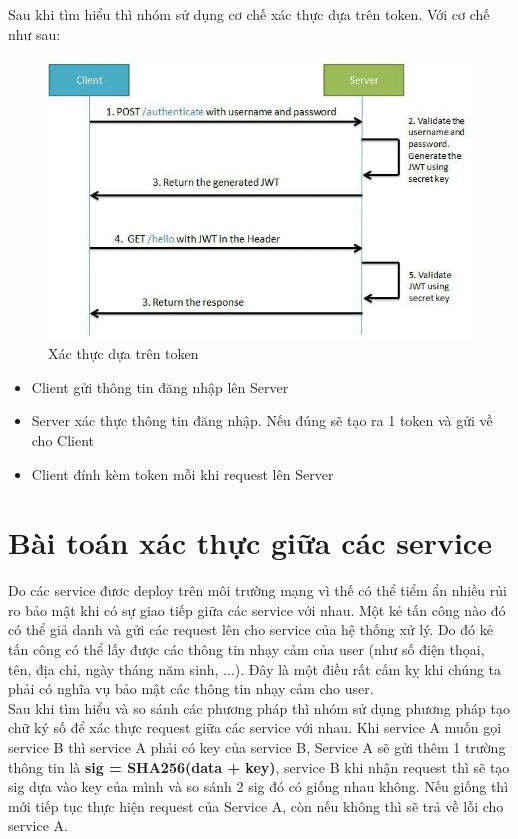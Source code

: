 		Sau khi tìm hiểu thì nhóm sử dụng cơ chế xác thực dựa trên token. Với cơ chế như sau:
		
		\begin{figure}[H]
			\includegraphics[width=1\textwidth]{Images/authbasedtoken.jpg}
			\centering
			\linebreak
			\caption{Xác thực dựa trên token\cite{jwtpic}}
		\end{figure}
		
		\begin{itemize}
                \item Client gửi thông tin đăng nhập lên Server
                \item Server xác thực thông tin đăng nhập. Nếu đúng sẽ tạo ra 1 token và gửi về cho Client
                \item Client đính kèm token mỗi khi request lên Server 
            \end{itemize}
		
		
		\section{Bài toán xác thực giữa các service}
		Do các service đươc deploy trên môi trường mạng vì thế có thể tiểm ẩn nhiều rủi ro bảo mật khi có sự giao tiếp giữa các service với nhau. Một kẻ tấn công nào đó có thể giả danh và gửi các request lên cho service của hệ thống xử lý. Do đó kẻ tấn công có thể lấy được các thông tin nhạy cảm của user (như số điện thọai, tên, địa chỉ, ngày tháng năm sinh, ...). Đây là một điều rất cấm kỵ khi chúng ta phải có nghĩa vụ bảo mật các thông tin nhạy cảm cho user.\\
		
		Sau khi tìm hiểu và so sánh các phương pháp thì nhóm sử dụng phương pháp tạo chữ ký số để xác thực request giữa các service với nhau. Khi service A muốn gọi service B thì service A phải có key của service B, Service A sẽ gửi thêm 1 trường thông tin là \textbf{sig = SHA256(data + key)}, service B khi nhận request thì sẽ tạo sig dựa vào key của mình và so sánh 2 sig đó có giống nhau không. Nếu giống thì mới tiếp tục thực hiện request của Service A, còn nếu không thì sẽ trả về lỗi cho service A.
		
